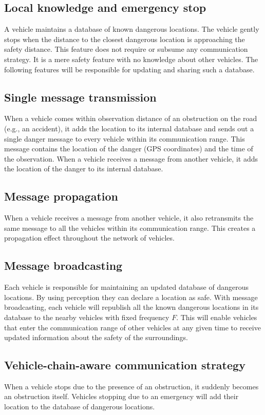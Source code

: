 \subsection{Local knowledge and emergency stop}
A vehicle maintains a database of known dangerous locations. The vehicle gently stops when the distance to the closest
dangerous location is approaching the safety distance. This feature does not require or subsume any communication
strategy. It is a mere safety feature with no knowledge about other vehicles. The following features will be responsible
for updating and sharing such a database.

\subsection{Single message transmission}
When a vehicle comes within observation distance of an obstruction on the road (e.g., an accident),
it adds the location to its internal database and sends out a single danger message to every vehicle within its
communication range. This message contains the location of the danger (GPS coordinates) and the time of the observation.
When a vehicle receives a message from another vehicle, it adds the location of the danger to its internal database.

\subsection{Message propagation}
When a vehicle receives a message from another vehicle, it also retransmits the same message to all the vehicles within
its communication range. This creates a propagation effect throughout the network of vehicles.

\subsection{Message broadcasting}
Each vehicle is responsible for maintaining an updated database of dangerous locations. By using perception
they can declare a location as safe. With message broadcasting, each vehicle will republish all the known dangerous
locations in its database to the nearby vehicles with fixed frequency $F$. This will enable vehicles that enter the
communication range of other vehicles at any given time to receive updated information about the safety of the surroundings.

\subsection{Vehicle-chain-aware communication strategy}
When a vehicle stops due to the presence of an obstruction, it suddenly becomes an obstruction itself.
Vehicles stopping due to an emergency will add their location to the database of dangerous locations.
